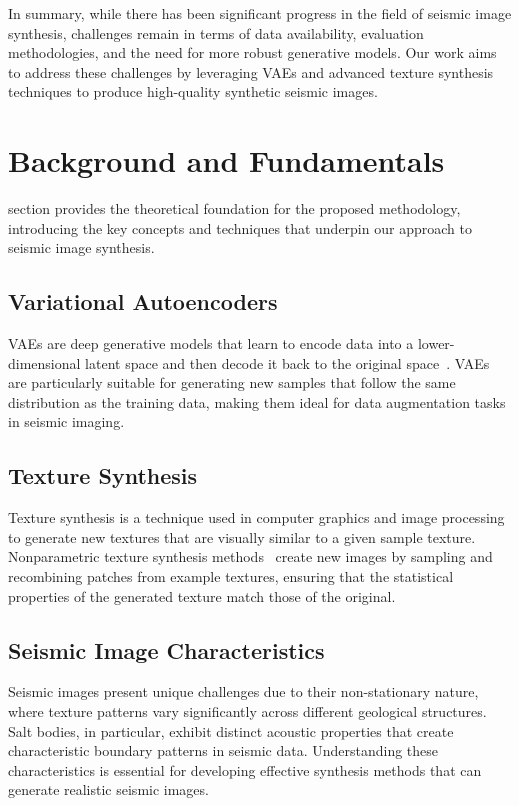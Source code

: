 \documentclass{ieeeaccess}
\begin{document}
In summary, while there has been significant progress in the field of seismic image synthesis, challenges remain in terms of data availability, evaluation methodologies, and the need for more robust generative models. Our work aims to address these challenges by leveraging VAEs and advanced texture synthesis techniques to produce high-quality synthetic seismic images.

\section{Background and Fundamentals}
\label{sec:background}

 section provides the theoretical foundation for the proposed methodology, introducing the key concepts and techniques that underpin our approach to seismic image synthesis.

\subsection{Variational Autoencoders}

VAEs are deep generative models that learn to encode data into a lower-dimensional latent space and then decode it back to the original space~\cite{Kingma2014}. VAEs are particularly suitable for generating new samples that follow the same distribution as the training data, making them ideal for data augmentation tasks in seismic imaging.

\subsection{Texture Synthesis}

Texture synthesis is a technique used in computer graphics and image processing to generate new textures that are visually similar to a given sample texture. Nonparametric texture synthesis methods~\cite{Efros1999} create new images by sampling and recombining patches from example textures, ensuring that the statistical properties of the generated texture match those of the original.

\subsection{Seismic Image Characteristics}

Seismic images present unique challenges due to their non-stationary nature, where texture patterns vary significantly across different geological structures. Salt bodies, in particular, exhibit distinct acoustic properties that create characteristic boundary patterns in seismic data. Understanding these characteristics is essential for developing effective synthesis methods that can generate realistic seismic images.
\end{document}
